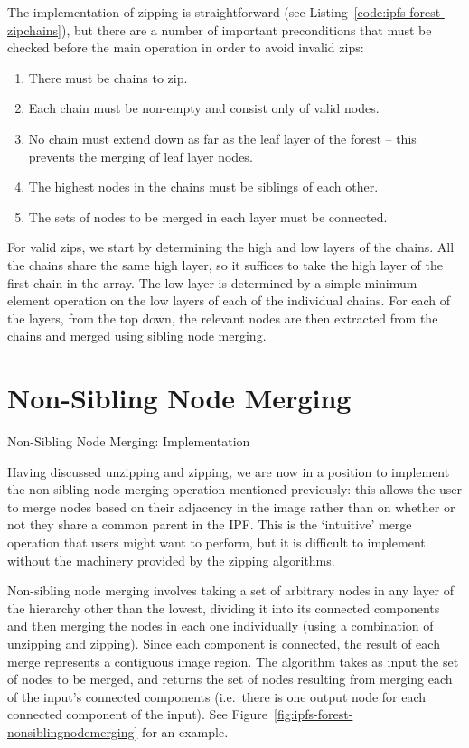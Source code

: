 \documentclass[10pt,twocolumn,twoside]{IEEEtran}
\begin{document}
The implementation of zipping is straightforward (see Listing~\ref{code:ipfs-forest-zipchains}), but there are a number of important preconditions that must be checked before the main operation in order to avoid invalid zips:
%
\begin{enumerate}
\item There must be chains to zip.
\item Each chain must be non-empty and consist only of valid nodes.
\item No chain must extend down as far as the leaf layer of the forest -- this prevents the merging of leaf layer nodes.
\item The highest nodes in the chains must be siblings of each other.
\item The sets of nodes to be merged in each layer must be connected.
\end{enumerate}
%
For valid zips, we start by determining the high and low layers of the chains. All the chains share the same high layer, so it suffices to take the high layer of the first chain in the array. The low layer is determined by a simple minimum element operation on the low layers of each of the individual chains. For each of the layers, from the top down, the relevant nodes are then extracted from the chains and merged using sibling node merging.

\section{Non-Sibling Node Merging}
\label{sec:nsmerge}

\begin{stulisting}[t]
\caption{Non-Sibling Node Merging: Implementation}
\label{code:ipfs-forest-mergenonsiblingnodes}

\end{stulisting}

Having discussed unzipping and zipping, we are now in a position to implement the non-sibling node merging operation mentioned previously: this allows the user to merge nodes based on their adjacency in the image rather than on whether or not they share a common parent in the IPF. This is the `intuitive' merge operation that users might want to perform, but it is difficult to implement without the machinery provided by the zipping algorithms.

Non-sibling node merging involves taking a set of arbitrary nodes in any layer of the hierarchy other than the lowest, dividing it into its connected components and then merging the nodes in each one individually (using a combination of unzipping and zipping). Since each component is connected, the result of each merge represents a contiguous image region. The algorithm takes as input the set of nodes to be merged, and returns the set of nodes resulting from merging each of the input's connected components (i.e.~there is one output node for each connected component of the input). See Figure~\ref{fig:ipfs-forest-nonsiblingnodemerging} for an example.
\end{document}
